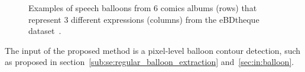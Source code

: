 

	\begin{figure}[!ht]	%
	  \centering
		\caption[Relation between speech balloon shape and contour informations]{Examples of speech balloons from 6 comics albums (rows) that represent 3 different expressions (columns) from the eBDtheque dataset~\cite{Guerin2013}.}
		\label{fig:in:contour_style}
	\end{figure}






The input of the proposed method is a pixel-level balloon contour detection, such as proposed in section~\ref{sub:se:regular_balloon_extraction} and~\ref{sec:in:balloon}.

